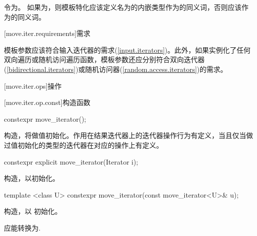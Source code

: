 \pnum
令为。
如果为，则模板特化应该定义名为的内嵌类型作为的同义词，否则应该作为的同义词。

[move.iter.requirements]{需求}

\pnum
模板参数应该符合输入迭代器的需求(\ref{input.iterators})。此外，如果实例化了任何双向遍历或随机访问遍历函数，模板参数还应分别符合双向迭代器(\ref{bidirectional.iterators})或随机访问器(\ref{random.access.iterators})的需求。

[move.iter.ops]{操作}

[move.iter.op.const]{构造函数}

%
\begin{itemdecl}
constexpr move_iterator();
\end{itemdecl}

\begin{itemdescr}
\pnum
\effects 构造，将做值初始化。作用在结果迭代器上的迭代器操作行为有定义，当且仅当做过值初始化的类型的迭代器在对应的操作上有定义。
\end{itemdescr}


%
\begin{itemdecl}
constexpr explicit move_iterator(Iterator i);
\end{itemdecl}

\begin{itemdescr}
\pnum
\effects
构造，以初始化。
\end{itemdescr}


%
\begin{itemdecl}
template <class U> constexpr move_iterator(const move_iterator<U>& u);
\end{itemdecl}

\begin{itemdescr}
\pnum
\effects
构造，以 初始化。

\pnum
\requires {} 应能转换为.
\end{itemdescr}

